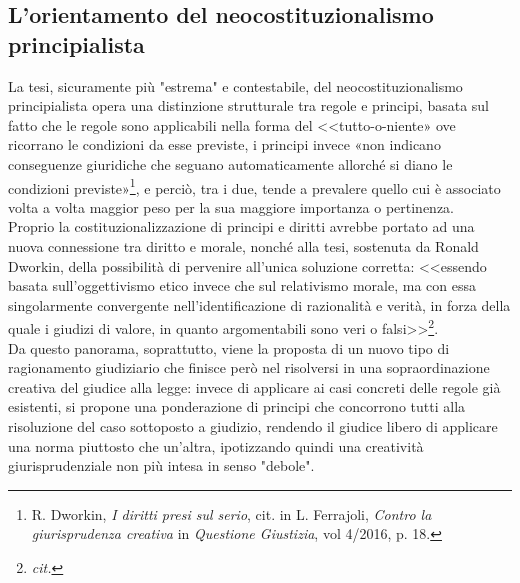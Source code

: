 \subsection{L'orientamento del neocostituzionalismo principialista}
La tesi, sicuramente più "estrema" e contestabile, del neocostituzionalismo principialista opera una distinzione strutturale tra regole e principi, basata sul fatto che le regole sono applicabili nella forma del <<tutto-o-niente» ove ricorrano le condizioni da esse previste, i principi invece «non indicano conseguenze giuridiche che seguano automaticamente allorché si diano le condizioni previste»\footnote{R. Dworkin, \textit{I diritti presi sul serio}, cit. in L. Ferrajoli, \textit{Contro la giurisprudenza creativa} in \textit{Questione Giustizia}, vol 4/2016, p. 18.}, e perciò, tra i due, tende a prevalere quello cui è associato volta a volta maggior peso per la sua maggiore importanza o pertinenza.
\\Proprio la costituzionalizzazione di principi e diritti avrebbe portato ad una nuova connessione tra diritto e morale, nonché alla tesi, sostenuta da Ronald Dworkin, della possibilità di pervenire all’unica soluzione corretta: <<essendo basata sull’oggettivismo etico invece che sul relativismo morale, ma con essa singolarmente convergente nell’identificazione di razionalità e verità, in forza della quale i giudizi di valore, in quanto argomentabili sono veri o falsi>>\footnote{\textit{cit.}}. 
\\Da questo panorama, soprattutto, viene la proposta di un nuovo tipo di ragionamento giudiziario che finisce però nel risolversi in una sopraordinazione creativa del giudice alla legge: invece di applicare ai casi concreti delle regole già esistenti, si propone una ponderazione di principi che concorrono tutti alla risoluzione del caso sottoposto a giudizio, rendendo il giudice libero di applicare una norma piuttosto che un'altra, ipotizzando quindi una creatività giurisprudenziale non più intesa in senso "debole".

